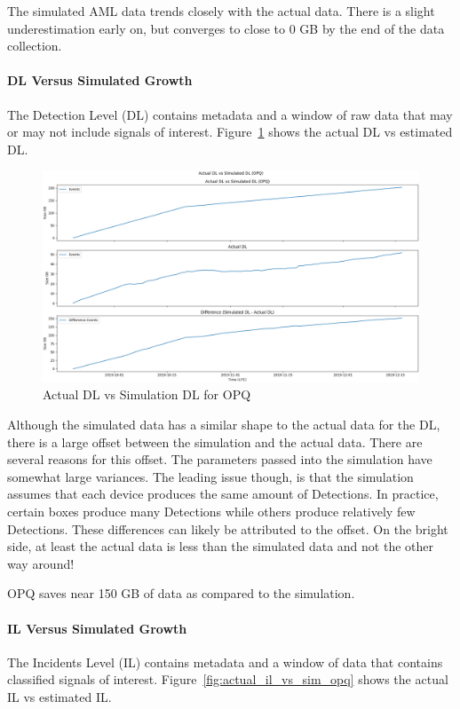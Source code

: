 The simulated AML data trends closely with the actual data. There is a slight underestimation early on, but converges to close to 0 GB by the end of the data collection.

\paragraph{DL Versus Simulated Growth}
The Detection Level (DL) contains metadata and a window of raw data that may or may not include signals of interest. Figure~\ref{fig:actual_dl_vs_sim_opq} shows the actual DL vs estimated DL.

\begin{figure}[H]
    \centering
    \includegraphics[width=\linewidth]{figures/actual_dl_vs_sim_opq.png}
    \caption{Actual DL vs Simulation DL for OPQ}
    \label{fig:actual_dl_vs_sim_opq}
\end{figure}

Although the simulated data has a similar shape to the actual data for the DL, there is a large offset between the simulation and the actual data. There are several reasons for this offset. The parameters passed into the simulation have somewhat large variances. The leading issue though, is that the simulation assumes that each device produces the same amount of Detections. In practice, certain boxes produce many Detections while others produce relatively few Detections. These differences can likely be attributed to the offset. On the bright side, at least the actual data is less than the simulated data and not the other way around!

OPQ saves near 150 GB of data as compared to the simulation.

\paragraph{IL Versus Simulated Growth}
The Incidents Level (IL) contains metadata and a window of data that contains classified signals of interest. Figure~\ref{fig:actual_il_vs_sim_opq} shows the actual IL vs estimated IL.

